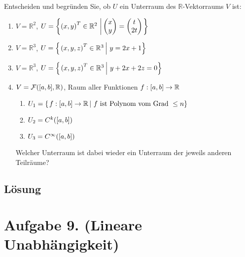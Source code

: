 \documentclass[german,12pt]{homework}
\newcommand{\RR}{\mathbb{R}}
\DeclarePairedDelimiter{\enbrace}{(}{)}
\DeclarePairedDelimiter{\benbrace}{[}{]}
\DeclarePairedDelimiter{\penbrace}{\{}{\}}
\begin{document}
    \begin{problem}
        Entscheiden und begründen Sie, ob \(U\) ein Unterraum des \(\RR\)-Vektorraums \(V\) ist:
        \begin{enumerate}
            \item \(V = \RR^2\), \quad \(U = \penbrace*{\enbrace*{x, y}^T \in \RR^2\,\left|\,\begin{pmatrix}x\\y\end{pmatrix} = \begin{pmatrix}t\\2t\end{pmatrix}\right.}\)
            \item \(V = \RR^3\), \quad \(U = \penbrace*{\left.\enbrace*{x, y, z}^T \in \RR^3\,\right|\,y = 2x + 1}\)
            \item \(V = \RR^3\), \quad \(U = \penbrace*{\left.\enbrace*{x, y, z}^T \in \RR^3\,\right|\,y + 2x + 2z = 0}\)
            \item \(V = \mathcal{F}\enbrace*{\benbrace*{a, b}, \RR}\), \quad Raum aller Funktionen \(f: \benbrace*{a, b} \to \RR\)
            \begin{enumerate}[label=\roman*.]
                \item \(U_1 = \penbrace*{\left.f: \benbrace*{a, b} \to \RR\,\right|\,f\text{ ist Polynom vom Grad }\le n}\)
                \item \(U_2 = C^k\enbrace*{\benbrace*{a, b}}\)
                \item \(U_3 = C^\infty\enbrace*{\benbrace*{a, b}}\)
            \end{enumerate}
            Welcher Unterraum ist dabei wieder ein Unterraum der jeweils anderen Teilräume?
        \end{enumerate}
    \end{problem}

    \subsection*{Lösung} \clearpage

    \section*{Aufgabe 9. (Lineare Unabhängigkeit)}
\end{document}
